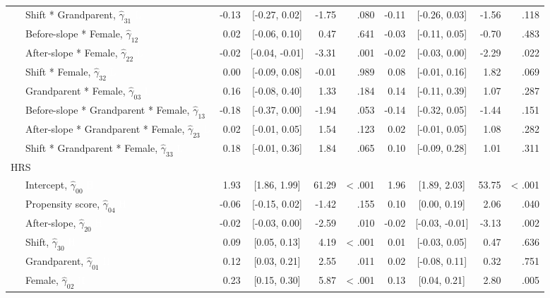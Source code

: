 \documentclass[
  english,
  man, noextraspace]{apa7}
\newenvironment{lltable}{\begin{landscape}\begin{center}\begin{ThreePartTable}}{\end{ThreePartTable}\end{center}\end{landscape}}
\begin{document}
\begin{appendix}
\begin{lltable}
{\begin{longtable}{lrcrrrcrr}
\ \ \ Shift * Grandparent, $\hat{\gamma}_{31}$ \textcolor{white}{L} & -0.13 & [-0.27, 0.02] & -1.75 & .080 & -0.11 & [-0.26, 0.03] & -1.56 & .118\\
\ \ \ Before-slope * Female, $\hat{\gamma}_{12}$ & 0.02 & [-0.06, 0.10] & 0.47 & .641 & -0.03 & [-0.11, 0.05] & -0.70 & .483\\
\ \ \ After-slope * Female, $\hat{\gamma}_{22}$ \textcolor{white}{L} & -0.02 & [-0.04, -0.01] & -3.31 & .001 & -0.02 & [-0.03, 0.00] & -2.29 & .022\\
\ \ \ Shift * Female, $\hat{\gamma}_{32}$ \textcolor{white}{L} & 0.00 & [-0.09, 0.08] & -0.01 & .989 & 0.08 & [-0.01, 0.16] & 1.82 & .069\\
\ \ \ Grandparent * Female, $\hat{\gamma}_{03}$ \textcolor{white}{L} & 0.16 & [-0.08, 0.40] & 1.33 & .184 & 0.14 & [-0.11, 0.39] & 1.07 & .287\\
\ \ \ Before-slope * Grandparent * Female, $\hat{\gamma}_{13}$ & -0.18 & [-0.37, 0.00] & -1.94 & .053 & -0.14 & [-0.32, 0.05] & -1.44 & .151\\
\ \ \ After-slope * Grandparent * Female, $\hat{\gamma}_{23}$ \textcolor{white}{L} & 0.02 & [-0.01, 0.05] & 1.54 & .123 & 0.02 & [-0.01, 0.05] & 1.08 & .282\\
\ \ \ Shift * Grandparent * Female, $\hat{\gamma}_{33}$ \textcolor{white}{L} & 0.18 & [-0.01, 0.36] & 1.84 & .065 & 0.10 & [-0.09, 0.28] & 1.01 & .311\\
HRS &  &  &  &  &  &  &  & \\
\ \ \ Intercept, $\hat{\gamma}_{00}$ \textcolor{white}{H} & 1.93 & [1.86, 1.99] & 61.29 & < .001 & 1.96 & [1.89, 2.03] & 53.75 & < .001\\
\ \ \ Propensity score, $\hat{\gamma}_{04}$ \textcolor{white}{H} & -0.06 & [-0.15, 0.02] & -1.42 & .155 & 0.10 & [0.00, 0.19] & 2.06 & .040\\
\ \ \ After-slope, $\hat{\gamma}_{20}$ \textcolor{white}{H} & -0.02 & [-0.03, 0.00] & -2.59 & .010 & -0.02 & [-0.03, -0.01] & -3.13 & .002\\
\ \ \ Shift, $\hat{\gamma}_{30}$ \textcolor{white}{H} & 0.09 & [0.05, 0.13] & 4.19 & < .001 & 0.01 & [-0.03, 0.05] & 0.47 & .636\\
\ \ \ Grandparent, $\hat{\gamma}_{01}$ \textcolor{white}{H} & 0.12 & [0.03, 0.21] & 2.55 & .011 & 0.02 & [-0.08, 0.11] & 0.32 & .751\\
\ \ \ Female, $\hat{\gamma}_{02}$ \textcolor{white}{H} & 0.23 & [0.15, 0.30] & 5.87 & < .001 & 0.13 & [0.04, 0.21] & 2.80 & .005\\

\end{longtable}}
\end{lltable}
\end{appendix}
\end{document}
